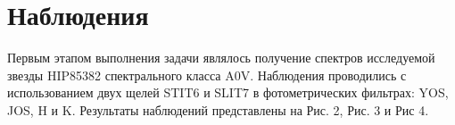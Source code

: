 \documentclass[a4paper]{article}
\begin{document}
\section{Наблюдения}
Первым этапом выполнения задачи являлось получение спектров исследуемой звезды HIP85382 спектрального класса A0V. Наблюдения проводились с использованием двух щелей STIT6 и SLIT7 в фотометрических фильтрах: YOS, JOS, H и K. Результаты наблюдений представлены на Рис. 2, Рис. 3 и Рис 4.
\begin{figure}[h]
\begin{minipage}[h]{0.5\linewidth}
\end{minipage}
\begin{minipage}[h]{0.5\linewidth}
\end{minipage}
\begin{minipage}[h]{0.50\linewidth}

\end{minipage}
\end{figure}
\end{document}
